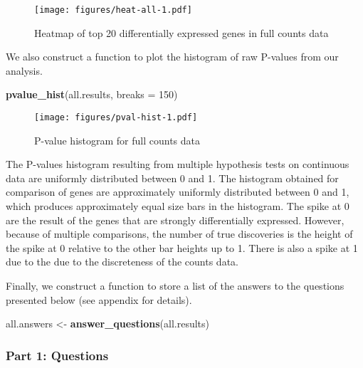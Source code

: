 \documentclass[]{article}
\newenvironment{Shaded}{\begin{snugshade}}{\end{snugshade}}
\newcommand{\KeywordTok}[1]{\textcolor[rgb]{0.13,0.29,0.53}{\textbf{{#1}}}}
\newcommand{\DataTypeTok}[1]{\textcolor[rgb]{0.13,0.29,0.53}{{#1}}}
\newcommand{\DecValTok}[1]{\textcolor[rgb]{0.00,0.00,0.81}{{#1}}}
\newcommand{\StringTok}[1]{\textcolor[rgb]{0.31,0.60,0.02}{{#1}}}
\newcommand{\NormalTok}[1]{{#1}}
\begin{document}
\begin{figure}[htbp]
\centering
\texttt{[image: figures/heat-all-1.pdf]}
\caption{Heatmap of top 20 differentially expressed genes in full counts
data}
\end{figure}

We also construct a function to plot the histogram of raw P-values from
our analysis.

\begin{Shaded}
\begin{Highlighting}[]
\KeywordTok{pvalue_hist}\NormalTok{(all.results, }\DataTypeTok{breaks =} \DecValTok{150}\NormalTok{)}
\end{Highlighting}
\end{Shaded}

\begin{figure}[htbp]
\centering
\texttt{[image: figures/pval-hist-1.pdf]}
\caption{P-value histogram for full counts data}
\end{figure}

The P-values histogram resulting from multiple hypothesis tests on
continuous data are uniformly distributed between 0 and 1. The histogram
obtained for comparison of genes are approximately uniformly distributed
between 0 and 1, which produces approximately equal size bars in the
histogram. The spike at 0 are the result of the genes that are strongly
differentially expressed. However, because of multiple comparisons, the
number of true discoveries is the height of the spike at 0 relative to
the other bar heights up to 1. There is also a spike at 1 due to the due
to the discreteness of the counts data.

Finally, we construct a function to store a list of the answers to the
questions presented below (see appendix for details).

\begin{Shaded}
\begin{Highlighting}[]
\NormalTok{all.answers <-}\StringTok{ }\KeywordTok{answer_questions}\NormalTok{(all.results)}
\end{Highlighting}
\end{Shaded}

\subsubsection{Part 1: Questions}\label{part-1-questions}
\end{document}
